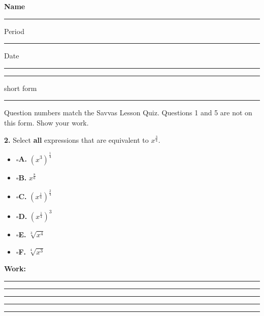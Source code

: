 \documentclass[11pt]{article}
\newcommand{\checkbox}{$\square$\;}
\begin{document}
\noindent\textbf{Name}\; \rule{6cm}{0.4pt} \hfill Period \rule{1.2cm}{0.4pt} \quad Date \rule{2.2cm}{0.4pt}

\vspace{4pt}\noindent\rule{\textwidth}{0.6pt}

\vspace{2pt} \hfill {\small short form}

\vspace{4pt}\noindent\rule{\textwidth}{0.6pt}

{\small Question numbers match the Savvas Lesson Quiz. Questions 1 and 5 are not on this form. Show your work.}

\vspace{4pt}
\begin{minipage}[t]{0.52\textwidth}
\textbf{2.} Select \textbf{all} expressions that are equivalent to $x^{\frac34}$.

\vspace{4pt}
\begin{itemize}[leftmargin=1.2em, itemsep=7pt]
\item[] \checkbox \textbf{A.} $\left(x^3\right)^{\frac14}$
\item[] \checkbox \textbf{B.} $x^{\frac86}$
\item[] \checkbox \textbf{C.} $\left(x^{\frac14}\right)^{\frac24}$
\item[] \checkbox \textbf{D.} $\left(x^{\frac14}\right)^3$
\item[] \checkbox \textbf{E.} $\sqrt[3]{x^4}$
\item[] \checkbox \textbf{F.} $\sqrt[4]{x^3}$
\end{itemize}
\end{minipage}\hfill
\begin{minipage}[t]{0.44\textwidth}
\textbf{Work:}

\vspace{4pt}\rule{\linewidth}{0.4pt}

\vspace{14pt}\rule{\linewidth}{0.4pt}

\vspace{14pt}\rule{\linewidth}{0.4pt}

\vspace{14pt}\rule{\linewidth}{0.4pt}
\end{minipage}

\vspace{10pt}\noindent\rule{\textwidth}{0.4pt}
\end{document}
